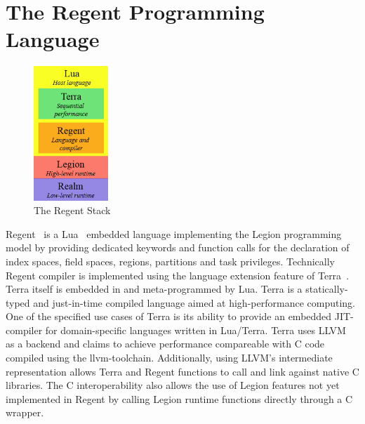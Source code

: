 \documentclass{article}      %
\begin{document}
\section{The Regent Programming Language}

\begin{figure}
	\centering
	\includegraphics[width=0.25\textwidth]{images/regent_stack}
	\caption{The Regent Stack}\label{fig:regent_stack}
\end{figure}

Regent~\cite{regentPaper,SlaughterThesis} is a Lua~\cite{lua} embedded language implementing the Legion programming model by providing dedicated keywords and function calls for the declaration of index spaces, field spaces, regions, partitions and task privileges. Technically Regent compiler is implemented using the language extension feature of Terra~\cite{Terra,TerraDesign}. Terra itself is embedded in and meta-programmed by Lua. Terra is a statically-typed and just-in-time compiled language aimed at high-performance computing. One of the specified use cases of Terra is its ability to provide an embedded JIT-compiler for domain-specific languages written in Lua/Terra. Terra uses LLVM~\cite{lattner2002llvm} as a backend and claims to achieve performance compareable with C code compiled using the llvm-toolchain. Additionally, using LLVM's intermediate representation allows Terra and Regent functions to call and link against native C libraries. The C interoperability also allows the use of Legion features not yet implemented in Regent by calling Legion runtime functions directly through a C wrapper.
\end{document}
